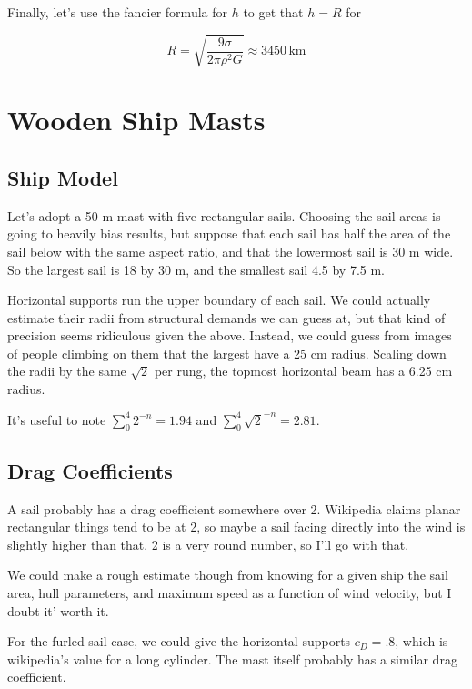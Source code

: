 \documentclass[12pt]{article}
\begin{document}
Finally, let's use the fancier formula for \(h\) to get that \(h=R\) for

\[ R = \sqrt{\frac{9\sigma}{2\pi\rho^2 G}} \approx 3450\,\mathrm{km}
\]



\section{Wooden Ship Masts}

\subsection{Ship Model}

Let's adopt a 50 m mast with five rectangular sails. Choosing the sail areas is going to heavily bias results, but suppose that each sail has half the area of the sail below with the same aspect ratio, and that the lowermost sail is 30 m wide. So the largest sail is 18 by 30 m, and the smallest sail 4.5  by 7.5 m.

Horizontal supports run the upper boundary of each sail. We could actually estimate their radii from structural demands we can guess at, but that kind of precision seems ridiculous given the above. Instead, we could guess from images of people climbing on them that the largest have a 25 cm radius. Scaling down the radii by the same \(\sqrt{2}\) per rung, the topmost horizontal beam has a 6.25 cm radius.

It's useful to note \(\sum_0^4 2^{-n} = 1.94\) and \(\sum_0^4 \sqrt{2}^{-n} = 2.81\).

\subsection{Drag Coefficients}

A sail probably has a drag coefficient somewhere over 2. Wikipedia claims planar rectangular things tend to be at 2, so maybe a sail facing directly into the wind is slightly higher than that. 2 is a very round number, so I'll go with that.

We could make a rough estimate though from knowing for a given ship the sail area, hull parameters, and maximum speed as a function of wind velocity, but I doubt it' worth it.

For the furled sail case, we could give the horizontal supports \(c_D=.8\), which is wikipedia's value for a long cylinder. The mast itself probably has a similar drag coefficient.
\end{document}
